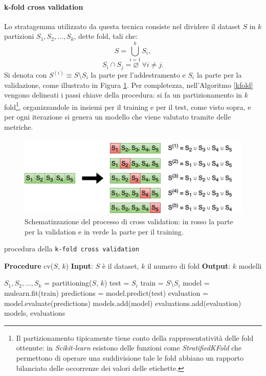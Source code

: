 \documentclass[12pt]{report}
\theoremstyle{definition}
\let\emptyset\varnothing
\begin{document}
\paragraph{k-fold cross validation}
Lo stratagemma utilizzato da questa tecnica consiste nel dividere il dataset $S$ in $k$ partizioni $S_1, S_2, ..., S_k$, dette fold, tali che:
\begin{equation}
     S = \bigcup\limits_{i=1}^{k} S_{i},
\end{equation}
\begin{equation}
    S_i \cap S_j = \emptyset \ \ \forall i \neq j.
\end{equation}
Si denota con $S^{(i)} \equiv S \setminus S_i$ la parte per l'addestramento e $S_i$ la parte per la validazione, come illustrato in Figura \ref{cv}.
Per completezza, nell'Algoritmo \ref{kfold} vengono delineati i passi chiave della procedura: si fa un partizionamento in $k$ fold\footnote{Il partizionamento tipicamente tiene conto della rappresentatività delle fold ottenute: in \textit{Scikit-learn} esistono delle funzioni come \textit{StratifiedKFold} che permettono di operare una suddivisione tale le fold abbiano un rapporto bilanciato delle occorrenze dei valori delle etichette.}, organizzandole in insiemi per il training e per il test, come visto sopra, e per ogni iterazione si genera un modello che viene valutato tramite delle metriche.
\begin{figure}
    \centering
    \includegraphics[scale=0.83]{images/cv.png}
    \caption{Schematizzazione del processo di cross validation: in rosso la parte per la validation e in verde la parte per il training.}
    \label{cv}
\end{figure}
\begin{algorithm}
\caption{procedura della \texttt{k-fold cross validation}}
\label{kfold}
\hspace*{\algorithmicindent} \textbf{Procedure} cv($S$, $k$)
\newline
\hspace*{\algorithmicindent} \textbf{Input}: $S$ è il dataset, $k$ il numero di fold
\newline
\hspace*{\algorithmicindent} \textbf{Output}: $k$ modelli
\begin{algorithmic}[1]
\STATE $S_1, S_2, ..., S_k$ = partitioning($S$, $k$)
\STATE test = $S_i$
\STATE train = $S \setminus S_i$
\STATE model = mulearn.fit(train)
\STATE predictions = model.predict(test)
\STATE evaluation = model.evaluate(predictions)
\STATE models.add(model)
\STATE evaluations.add(evaluation)
\ENDFOR
\RETURN models, evaluations
\end{algorithmic}
\end{algorithm}
\end{document}
